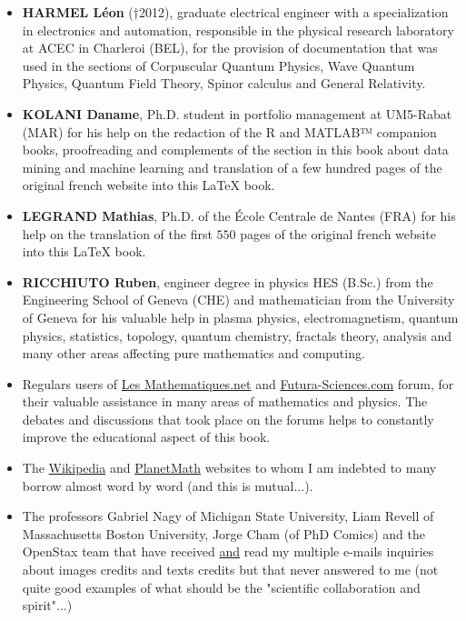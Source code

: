 \documentclass[12pt,a4paper,twoside,openright]{report}
\theoremstyle{definition}
\theoremstyle{itexmp}
\numberwithin{equation}{section}
\begin{document}
	\begin{itemize}		
		\item \textbf{HARMEL Léon }(†2012), graduate electrical engineer with a specialization in electronics and automation, responsible in the physical research laboratory at ACEC in Charleroi (BEL), for the provision of documentation that was used in the sections of Corpuscular Quantum Physics, Wave Quantum Physics,  Quantum Field Theory, Spinor calculus and General Relativity.
		
		\item \textbf{KOLANI Daname}, Ph.D. student in portfolio management at UM5-Rabat (MAR) for his help on the redaction of the R and MATLAB™ companion books, proofreading and complements of the section in this book about data mining and machine learning and translation of a few hundred pages of the original french website into this \LaTeX{} book.
		
		\item \textbf{LEGRAND Mathias}, Ph.D. of the École Centrale de Nantes (FRA) for his help on the translation of the first $550$  pages of the original french website into this \LaTeX{} book.
		
		\item \textbf{RICCHIUTO Ruben}, engineer degree in physics HES (B.Sc.) from the Engineering School of Geneva (CHE) and mathematician from the University of Geneva for his valuable help in plasma physics, electromagnetism, quantum physics, statistics, topology, quantum chemistry, fractals theory, analysis and many other areas affecting pure mathematics and computing.
		
		\item Regulars users of \href{http://www.les-mathematiques.net}{{\color{blue} Les Mathematiques.net}} and \href{http://www.futura-sciences.com}{{\color{blue} Futura-Sciences.com}} forum, for their valuable assistance in many areas of mathematics and physics. The debates and discussions that took place on the forums helps to constantly improve the educational aspect of this book.
		
		\item The \href{http://www.wikipedia.com}{{\color{blue} Wikipedia}} and \href{http://www.planetmath.com}{{\color{blue} PlanetMath}} websites to whom I am indebted to many borrow almost word by word (and this is mutual...).
		
		\item The professors Gabriel Nagy of Michigan State University, Liam Revell of Massachusetts Boston University, Jorge Cham (of PhD Comics) and the OpenStax team that have received \underline{and} read my multiple e-mails inquiries about images credits and texts credits but that never answered to me (not quite good examples of what should be the "scientific collaboration and spirit"...)
	\end{itemize}
	
\end{document}
